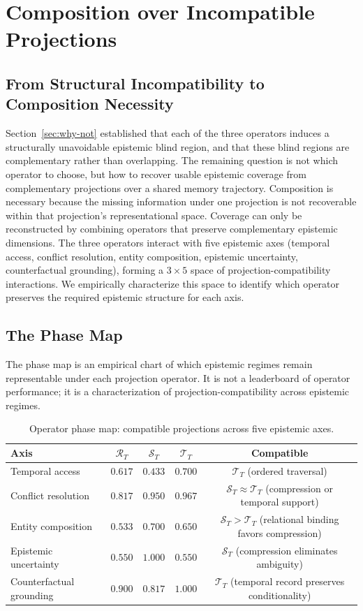 \documentclass[letterpaper,twocolumn,10pt]{article}
\begin{document}
\section{Composition over Incompatible Projections}
\label{sec:composition}

\subsection{From Structural Incompatibility to Composition Necessity}
Section~\ref{sec:why-not} established that each of the three operators induces a structurally unavoidable epistemic blind region, and that these blind regions are complementary rather than overlapping. The remaining question is not which operator to choose, but how to recover usable epistemic coverage from complementary projections over a shared memory trajectory. Composition is necessary because the missing information under one projection is not recoverable within that projection's representational space. Coverage can only be reconstructed by combining operators that preserve complementary epistemic dimensions. The three operators interact with five epistemic axes (temporal access, conflict resolution, entity composition, epistemic uncertainty, counterfactual grounding), forming a $3\times5$ space of projection-compatibility interactions. We empirically characterize this space to identify which operator preserves the required epistemic structure for each axis.

\subsection{The Phase Map}
The phase map is an empirical chart of which epistemic regimes remain representable under each projection operator. It is not a leaderboard of operator performance; it is a characterization of projection-compatibility across epistemic regimes.
\begin{table}[t]
\caption{Operator phase map: compatible projections across five epistemic axes.}
\centering
\footnotesize
\begin{tabular}{lcccc}
\toprule
Axis & $\mathcal{R}_T$ & $\mathcal{S}_T$ & $\mathcal{T}_T$ & Compatible \\
\midrule
Temporal access & $0.617$ & $0.433$ & $\mathbf{0.700}$ & $\mathcal{T}_T$ (ordered traversal)\\
Conflict resolution & $0.817$ & $\mathbf{0.950}$ & $\mathbf{0.967}$ & $\mathcal{S}_T\approx\mathcal{T}_T$ (compression or temporal support)\\
Entity composition & $\mathbf{0.533}$ & $0.700$ & $0.650$ & $\mathcal{S}_T > \mathcal{T}_T$ (relational binding favors compression)\\
Epistemic uncertainty & $0.550$ & $\mathbf{1.000}$ & $0.550$ & $\mathcal{S}_T$ (compression eliminates ambiguity)\\
Counterfactual grounding & $0.900$ & $0.817$ & $\mathbf{1.000}$ & $\mathcal{T}_T$ (temporal record preserves conditionality)\\
\bottomrule
\end{tabular}
\end{table}
\end{document}
